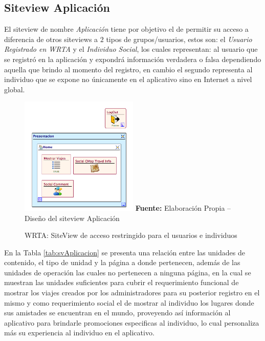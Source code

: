 \documentclass[oneside,12pt,a4paper]{memoir}%
\begin{document}
			
		\subsection{Siteview Aplicaci\'on}
		\label{ssec:svAplicacion}
			
			El siteview de nombre \textit{Aplicaci\'on} tiene por objetivo el de permitir
			su acceso a diferencia de otros siteviews a $2$ tipos de grupos/usuarios,
			estos son: el \textit{Usuario Registrado en WRTA} y el \textit{Individuo
			Social}, los cuales representan: al usuario que se registr\'o en la
			aplicaci\'on y expondr\'a informaci\'on verdadera o falsa dependiendo aquella
			que brindo al momento del registro, en cambio el segundo representa al
			individuo que se expone no \'unicamente en el aplicativo sino en Internet a
			nivel global.
		
			\begin{figure}[here]
				\centering
				\caption{WRTA: SiteView de acceso restringido para el usuarios e individuos}
				\includegraphics[width=0.5\textwidth]{figure/fig_WRTA_svAplicacion.png}
				\newline
				\textbf{Fuente:} Elaboraci\'on Propia -- Dise\~no del siteview Aplicaci\'on
				\label{fig:WRTA_svAplicacion}
			\end{figure}	
		
			En la Tabla \ref{tab:svAplicacion} se presenta una relaci\'on entre las unidades
			de contenido, el tipo de unidad y la p\'agina a donde
			pertenecen, adem\'as de las unidades de operaci\'on las cuales no pertenecen
			a ninguna p\'agina, en la cual se muestran las unidades suficientes para
			cubrir el requerimiento funcional de mostrar los viajes creados por los
			administradores para su posterior registro en el mismo y como requerimiento
			social el de mostrar al individuo los lugares donde sus amistades se
			encuentran en el mundo, proveyendo as\'i informaci\'on al aplicativo para
			brindarle promociones especificas al individuo, lo cual personaliza m\'as su
			experiencia al individuo en el aplicativo.
\end{document}
